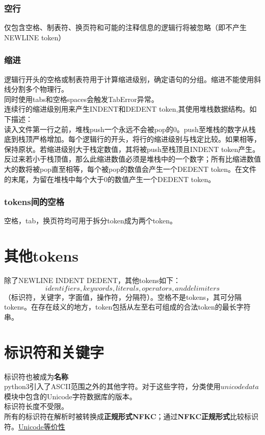 \documentclass[10pt,UTF8]{ctexart}
\begin{document}
\subsubsection{空行}
仅包含空格、制表符、换页符和可能的注释信息的逻辑行将被忽略（即不产生NEWLINE token）
\subsubsection{缩进}
逻辑行开头的空格或制表符用于计算缩进级别，确定语句的分组。缩进不能使用斜线分割多个物理行。\\
\indent 同时使用tabs和空格spaces会触发TabError异常。\\
\indent 连续行的缩进级别用来产生INDENT和DEDENT token,其使用堆栈数据结构。如下描述：\\
\indent 读入文件第一行之前，堆栈push一个永远不会被pop的0。push至堆栈的数字从栈底到栈顶严格增加。每个逻辑行的开头，将行的缩进级别与栈定比较。如果相等，保持原状。若缩进级别大于栈定数值，其将被push至栈顶且INDENT token产生。反过来若小于栈顶值，那么此缩进数值必须是堆栈中的一个数字；所有比缩进数值大的数将被pop直至相等，每个被pop的数值会产生一个DEDENT token。在文件的末尾，为留在堆栈中每个大于0的数值产生一个DEDENT token。
\subsubsection{tokens间的空格}
空格，tab，换页符均可用于拆分token成为两个token。
\section{其他tokens}
除了NEWLINE INDENT DEDENT，其他tokens如下：\[identifiers, keywords, literals, operators, and delimiters\]（标识符，关键字，字面值，操作符，分隔符）。空格不是tokens，其可分隔tokens。在存在歧义的地方，token包括从左至右可组成的合法token的最长字符串。
\section{标识符和关键字}
标识符也被成为\textbf{名称}\\
\indent python3引入了ASCII范围之外的其他字符。对于这些字符，分类使用$unicodedata$模块中包含的Unicode字符数据库的版本。\\
\indent 标识符长度不受限。\\
\indent 所有的标识符在解析时被转换成\textbf{正规形式NFKC}；通过\textbf{NFKC正规形式}比较标识符。\href{https://zh.wikipedia.org/wiki/Unicode%E7%AD%89%E5%83%B9%E6%80%A7}{Unicode等价性}
\end{document}
